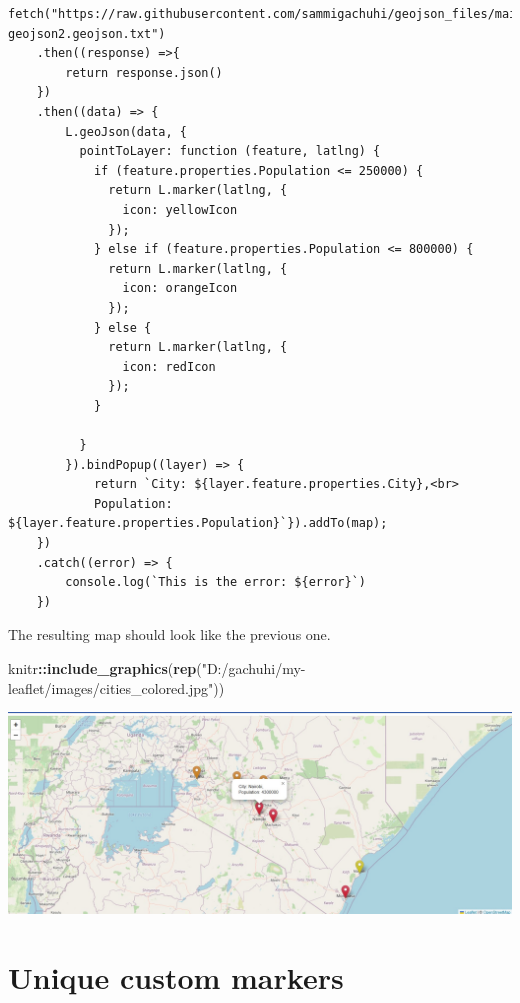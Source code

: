 \documentclass[
]{book}
\newenvironment{Shaded}{\begin{snugshade}}{\end{snugshade}}
\newcommand{\FunctionTok}[1]{\textcolor[rgb]{0.13,0.29,0.53}{\textbf{#1}}}
\newcommand{\NormalTok}[1]{#1}
\newcommand{\SpecialCharTok}[1]{\textcolor[rgb]{0.81,0.36,0.00}{\textbf{#1}}}
\newcommand{\StringTok}[1]{\textcolor[rgb]{0.31,0.60,0.02}{#1}}
\begin{document}
\begin{verbatim}
fetch("https://raw.githubusercontent.com/sammigachuhi/geojson_files/main/cities-geojson2.geojson.txt")
    .then((response) =>{
        return response.json()
    })
    .then((data) => {
        L.geoJson(data, {
          pointToLayer: function (feature, latlng) {
            if (feature.properties.Population <= 250000) {
              return L.marker(latlng, {
                icon: yellowIcon 
              });
            } else if (feature.properties.Population <= 800000) {
              return L.marker(latlng, {
                icon: orangeIcon 
              });
            } else {
              return L.marker(latlng, {
                icon: redIcon 
              });
            }
            
          }
        }).bindPopup((layer) => {
            return `City: ${layer.feature.properties.City},<br>
            Population: ${layer.feature.properties.Population}`}).addTo(map);
    })
    .catch((error) => {
        console.log(`This is the error: ${error}`)
    })
\end{verbatim}

The resulting map should look like the previous one.

\begin{Shaded}
\begin{Highlighting}[]
\NormalTok{knitr}\SpecialCharTok{::}\FunctionTok{include\_graphics}\NormalTok{(}\FunctionTok{rep}\NormalTok{(}\StringTok{"D:/gachuhi/my{-}leaflet/images/cities\_colored.jpg"}\NormalTok{))}
\end{Highlighting}
\end{Shaded}

\includegraphics{../images/cities_colored.jpg}

\hypertarget{unique-custom-markers}{%
\section{Unique custom markers}\label{unique-custom-markers}}
\end{document}
